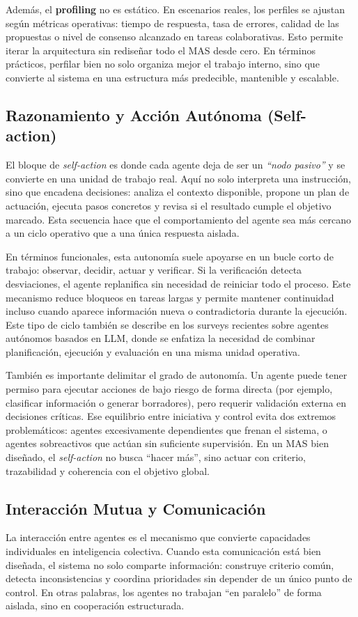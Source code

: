 \documentclass[12pt,a4paper]{article}
\begin{document}
Además, el \textbf{profiling} no es estático. En escenarios reales, los perfiles se ajustan según métricas operativas: tiempo de respuesta, tasa de errores, calidad de las propuestas o nivel de consenso alcanzado en tareas colaborativas. Esto permite iterar la arquitectura sin rediseñar todo el MAS desde cero. En términos prácticos, perfilar bien no solo organiza mejor el trabajo interno, sino que convierte al sistema en una estructura más predecible, mantenible y escalable.
\subsection{Razonamiento y Acción Autónoma (Self-action)}
El bloque de \textit{self-action} es donde cada agente deja de ser un \textit{``nodo pasivo''} y se convierte en una unidad de trabajo real. Aquí no solo interpreta una instrucción, sino que encadena decisiones: analiza el contexto disponible, propone un plan de actuación, ejecuta pasos concretos y revisa si el resultado cumple el objetivo marcado. Esta secuencia hace que el comportamiento del agente sea más cercano a un ciclo operativo que a una única respuesta aislada.

En términos funcionales, esta autonomía suele apoyarse en un bucle corto de trabajo: observar, decidir, actuar y verificar. Si la verificación detecta desviaciones, el agente replanifica sin necesidad de reiniciar todo el proceso. Este mecanismo reduce bloqueos en tareas largas y permite mantener continuidad incluso cuando aparece información nueva o contradictoria durante la ejecución. Este tipo de ciclo también se describe en los surveys recientes sobre agentes autónomos basados en LLM, donde se enfatiza la necesidad de combinar planificación, ejecución y evaluación en una misma unidad operativa.

También es importante delimitar el grado de autonomía. Un agente puede tener permiso para ejecutar acciones de bajo riesgo de forma directa (por ejemplo, clasificar información o generar borradores), pero requerir validación externa en decisiones críticas. Ese equilibrio entre iniciativa y control evita dos extremos problemáticos: agentes excesivamente dependientes que frenan el sistema, o agentes sobreactivos que actúan sin suficiente supervisión. En un MAS bien diseñado, el \textit{self-action} no busca ``hacer más'', sino actuar con criterio, trazabilidad y coherencia con el objetivo global.
\subsection{Interacción Mutua y Comunicación}
La interacción entre agentes es el mecanismo que convierte capacidades individuales en inteligencia colectiva. Cuando esta comunicación está bien diseñada, el sistema no solo comparte información: construye criterio común, detecta inconsistencias y coordina prioridades sin depender de un único punto de control. En otras palabras, los agentes no trabajan ``en paralelo'' de forma aislada, sino en cooperación estructurada.
\end{document}
